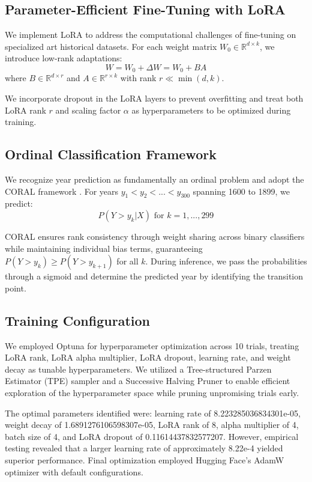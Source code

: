 \documentclass[10pt,twocolumn,letterpaper]{article}
\begin{document}
\subsection{Parameter-Efficient Fine-Tuning with LoRA}

We implement LoRA \cite{Hu21LoRA} to address the computational challenges of fine-tuning on specialized art historical datasets. For each weight matrix $W_0 \in \mathbb{R}^{d \times k}$, we introduce low-rank adaptations:
$$W = W_0 + \Delta W = W_0 + BA$$
where $B \in \mathbb{R}^{d \times r}$ and $A \in \mathbb{R}^{r \times k}$ with rank $r \ll \min(d, k)$.

We incorporate dropout in the LoRA layers to prevent overfitting and treat both LoRA rank $r$ and scaling factor $\alpha$ as hyperparameters to be optimized during training.

\subsection{Ordinal Classification Framework}

We recognize year prediction as fundamentally an ordinal problem and adopt the CORAL framework \cite{Cao20Ordinal}. For years $y_1 < y_2 < ... < y_{300}$ spanning 1600 to 1899, we predict:
$$P(Y > y_k | X) \text{ for } k = 1, ..., 299$$

CORAL ensures rank consistency through weight sharing across binary classifiers while maintaining individual bias terms, guaranteeing $P(Y > y_k) \geq P(Y > y_{k+1})$ for all $k$. During inference, we pass the probabilities through a sigmoid and determine the predicted year by identifying the transition point.

\subsection{Training Configuration}

We employed Optuna for hyperparameter optimization across 10 trials, treating LoRA rank, LoRA alpha multiplier, LoRA dropout, learning rate, and weight decay as tunable hyperparameters. We utilized a Tree-structured Parzen Estimator (TPE) sampler and a Successive Halving Pruner to enable efficient exploration of the hyperparameter space while pruning unpromising trials early.

The optimal parameters identified were: learning rate of 8.223285036834301e-05, weight decay of 1.6891276106598307e-05, LoRA rank of 8, alpha multiplier of 4, batch size of 4, and LoRA dropout of 0.11614437832577207. However, empirical testing revealed that a larger learning rate of approximately 8.22e-4 yielded superior performance. Final optimization employed Hugging Face's AdamW optimizer with default configurations.
\end{document}
